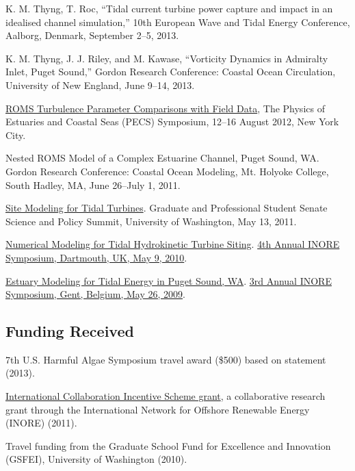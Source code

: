 \documentclass[10pt,letterpaper]{article}
\renewenvironment{itemize}{
  \begin{list}{}{
    \setlength{\leftmargin}{1.5em}
    \setlength{\itemsep}{0.25em}
    \setlength{\parskip}{0pt}
    \setlength{\parsep}{0.25em}
  }
}{
  \end{list}
}
\begin{document}
\begin{itemize}

\item K. M. Thyng, T. Roc, ``Tidal current turbine power capture and impact in an idealised channel simulation,'' 10th European Wave and Tidal Energy Conference, Aalborg, Denmark, September 2--5, 2013.

\item K. M. Thyng, J. J. Riley, and M. Kawase, ``Vorticity Dynamics in Admiralty Inlet, Puget Sound,'' Gordon Research Conference: Coastal Ocean Circulation, University of New England, June 9--14, 2013.

\item \href{http://pong.tamu.edu/~kthyng/posters/pecs.pdf}{ROMS Turbulence Parameter Comparisons with Field Data}, The Physics of Estuaries and Coastal Seas (PECS) Symposium, 12--16 August 2012, New York City.

\item Nested ROMS Model of a Complex Estuarine Channel, Puget Sound, WA. Gordon Research Conference: Coastal Ocean Modeling,
  Mt. Holyoke College, South Hadley,  MA, 
  June 26--July 1, 2011.
  
\item \href{http://froude.me.washington.edu/presentations/GPSS051311.pdf}{Site Modeling for Tidal Turbines}. Graduate and Professional Student Senate Science and Policy Summit, University of Washington, May 13, 2011.

\item \href{http://froude.me.washington.edu/presentations/InorePoster2010/inore.pdf}{Numerical Modeling for Tidal
Hydrokinetic Turbine Siting}. \href{http://www.inore.org}{4th Annual INORE Symposium, Dartmouth, UK, May 9, 2010}.

\item \href{http://froude.me.washington.edu/presentations/inore_poster2009.pdf}{Estuary Modeling for Tidal Energy in Puget Sound, WA}. \href{http://www.inore.org}{3rd Annual INORE Symposium, Gent, Belgium, May 26, 2009}.

\end{itemize}


\subsection*{Funding Received}

\begin{itemize}
  \item 7th U.S. Harmful Algae Symposium travel award (\$500) based on statement (2013).
  \item \href{http://inore.org/news/icis_travel_grants/}{International Collaboration Incentive Scheme grant}, a collaborative research grant through the International Network for Offshore Renewable Energy (INORE) (2011).
  \item Travel funding from the Graduate School Fund for Excellence and Innovation (GSFEI), University of Washington (2010).
\end{itemize}
\end{document}

